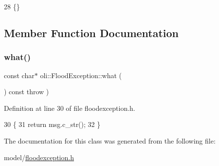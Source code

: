 \begin{DoxyCode}
28 \{\}
\end{DoxyCode}


\subsection{Member Function Documentation}
\hypertarget{classoli_1_1_flood_exception_a03204c3d2890b5de6690df657b770f72}{}\label{classoli_1_1_flood_exception_a03204c3d2890b5de6690df657b770f72} 
\subsubsection{\texorpdfstring{what()}{what()}}
{\footnotesize\ttfamily const char$\ast$ oli\+::\+Flood\+Exception\+::what (\begin{DoxyParamCaption}{ }\end{DoxyParamCaption}) const throw  ) \hspace{0.3cm}{\ttfamily [inline]}}



Definition at line 30 of file floodexception.\+h.


\begin{DoxyCode}
30                                      \{
31         \textcolor{keywordflow}{return} msg.c\_str();
32     \}
\end{DoxyCode}


The documentation for this class was generated from the following file\+:\begin{DoxyCompactItemize}
\item 
model/\hyperlink{floodexception_8h}{floodexception.\+h}\end{DoxyCompactItemize}
